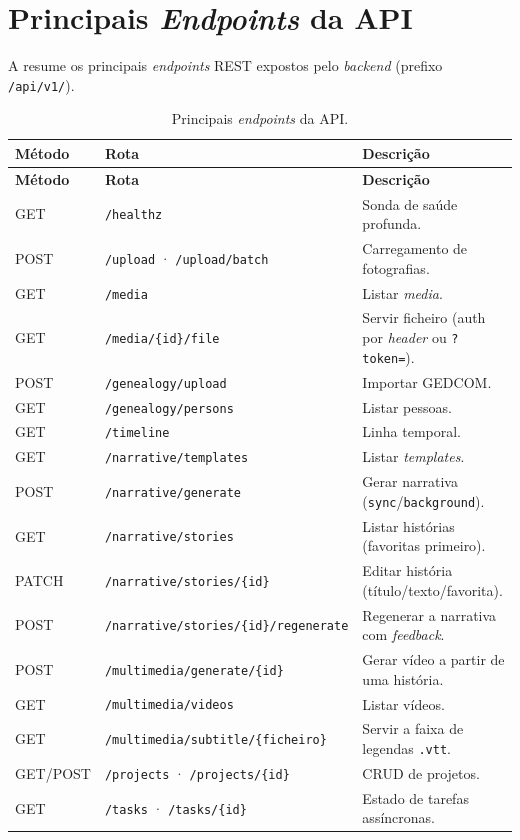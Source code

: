 \chapter{Principais \emph{Endpoints} da API}
\label{ap:endpoints}

A  resume os principais \emph{endpoints} REST expostos
pelo \emph{backend} (prefixo \texttt{/api/v1/}).

\begin{longtable}{@{}p{1.4cm}p{6.6cm}p{5.4cm}@{}}
\caption{Principais \emph{endpoints} da API.}\label{tab:endpoints}\\
\toprule
\textbf{Método} & \textbf{Rota} & \textbf{Descrição} \\
\midrule
\endfirsthead
\toprule
\textbf{Método} & \textbf{Rota} & \textbf{Descrição} \\
\midrule
\endhead
GET    & \texttt{/healthz}                       & Sonda de saúde profunda. \\
POST   & \texttt{/upload} · \texttt{/upload/batch} & Carregamento de fotografias. \\
GET    & \texttt{/media}                         & Listar \emph{media}. \\
GET    & \texttt{/media/\{id\}/file}             & Servir ficheiro (auth por \emph{header} ou \texttt{?token=}). \\
POST   & \texttt{/genealogy/upload}              & Importar GEDCOM. \\
GET    & \texttt{/genealogy/persons}             & Listar pessoas. \\
GET    & \texttt{/timeline}                      & Linha temporal. \\
GET    & \texttt{/narrative/templates}           & Listar \emph{templates}. \\
POST   & \texttt{/narrative/generate}            & Gerar narrativa (\texttt{sync}/\texttt{background}). \\
GET    & \texttt{/narrative/stories}             & Listar histórias (favoritas primeiro). \\
PATCH  & \texttt{/narrative/stories/\{id\}}       & Editar história (título/texto/favorita). \\
POST   & \texttt{/narrative/stories/\{id\}/regenerate} & Regenerar a narrativa com \emph{feedback}. \\
POST   & \texttt{/multimedia/generate/\{id\}}    & Gerar vídeo a partir de uma história. \\
GET    & \texttt{/multimedia/videos}             & Listar vídeos. \\
GET    & \texttt{/multimedia/subtitle/\{ficheiro\}} & Servir a faixa de legendas \texttt{.vtt}. \\
GET/POST & \texttt{/projects} · \texttt{/projects/\{id\}} & CRUD de projetos. \\
GET    & \texttt{/tasks} · \texttt{/tasks/\{id\}} & Estado de tarefas assíncronas. \\
\bottomrule
\end{longtable}

